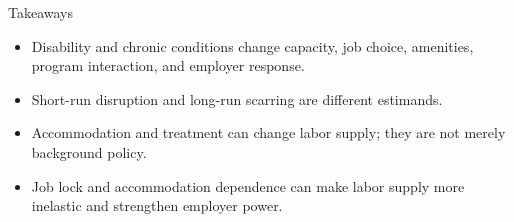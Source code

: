 \documentclass[aspectratio=169,11pt]{beamer}
\begin{document}
\begin{frame}{Takeaways}
\begin{itemize}
    \item Disability and chronic conditions change capacity, job choice, amenities, program interaction, and employer response.
    \item Short-run disruption and long-run scarring are different estimands.
    \item Accommodation and treatment can change labor supply; they are not merely background policy.
    \item Job lock and accommodation dependence can make labor supply more inelastic and strengthen employer power.
\end{itemize}
\end{frame}
\end{document}
